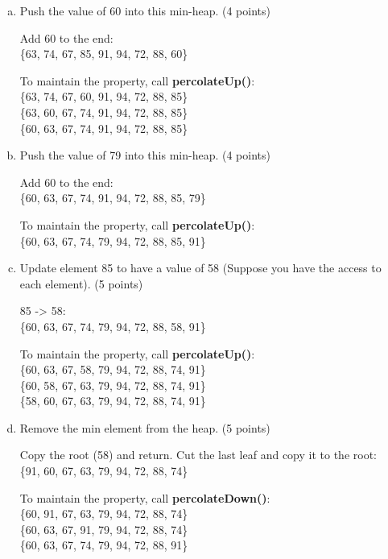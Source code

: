 \documentclass[11pt]{exam}
\begin{document}
\begin{enumerate}[a)]
\item Push the value of 60 into this min-heap. (4 points)
\begin{solution}
\par
Add 60 to the end: \\
\{63, 74, 67, 85, 91, 94, 72, 88, 60\}
\par
To maintain the property, call \textbf{percolateUp()}: \\
\{63, 74, 67, 60, 91, 94, 72, 88, 85\} \\
\{63, 60, 67, 74, 91, 94, 72, 88, 85\} \\
\{60, 63, 67, 74, 91, 94, 72, 88, 85\}
\end{solution}

\item Push the value of 79 into this min-heap. (4 points)
\begin{solution}
\par
Add 60 to the end: \\
\{60, 63, 67, 74, 91, 94, 72, 88, 85, 79\}
\par
To maintain the property, call \textbf{percolateUp()}: \\
\{60, 63, 67, 74, 79, 94, 72, 88, 85, 91\}
\end{solution}

\item Update element 85 to have a value of 58 (Suppose you have the access to each element). (5 points)
\begin{solution}
\par
85 -> 58: \\
\{60, 63, 67, 74, 79, 94, 72, 88, 58, 91\}
\par
To maintain the property, call \textbf{percolateUp()}: \\
\{60, 63, 67, 58, 79, 94, 72, 88, 74, 91\} \\
\{60, 58, 67, 63, 79, 94, 72, 88, 74, 91\}  \\
\{58, 60, 67, 63, 79, 94, 72, 88, 74, 91\}
\end{solution}

\item Remove the min element from the heap. (5 points)
\begin{solution}
\par
Copy the root (58) and return. Cut the last leaf and copy it to the root: \\
\{91, 60, 67, 63, 79, 94, 72, 88, 74\}
\par
To maintain the property, call \textbf{percolateDown()}: \\
\{60, 91, 67, 63, 79, 94, 72, 88, 74\} \\
\{60, 63, 67, 91, 79, 94, 72, 88, 74\} \\
\{60, 63, 67, 74, 79, 94, 72, 88, 91\}
\end{solution}


\end{enumerate}
\end{document}
